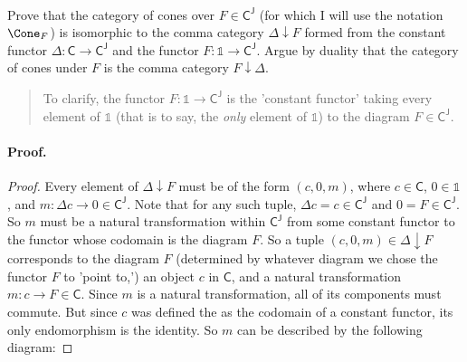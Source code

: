 \documentclass[main.tex]{subfiles}
\begin{document}
	
\paragraph{} 

\begin{exercise}
Prove that the category of cones over $ F \in \mathsf{C^J} $ (for which I will
use the notation $ \Cone_F $) is isomorphic to the comma category $
\Delta \downarrow F $ formed from the constant functor $ \Delta \colon
\mathsf{C} \to \mathsf{C^J} $ and the functor $ F \colon \mathbb{1} \to
\mathsf{C^J} $. Argue by duality that the category of cones under $ F $ is the
comma category $ F \downarrow \Delta $.
\end{exercise}
\begin{quote}
	{\small To clarify, the functor $ F \colon \mathbb{1} \to \mathsf{C^J}$ is the 'constant functor' taking every element of  $ \mathbb{1} $ (that is to say, the \textit{only} element of $ \mathbb{1} $) to the diagram $ F \in \mathsf{C^J} $.}
\end{quote}

\paragraph{Proof.} 
\begin{proof}
Every element of $ \Delta \downarrow F $ must be of the form $ (c, 0, m) $,
where $ c \in \textsf{C} $, $ 0 \in \mathbb{1} $, and $ m \colon \Delta c \to 0
\in \mathsf{C^J} $. Note that for any such tuple, $ \Delta c = c \in
\mathsf{C^J}$ and $ 0 = F \in \mathsf{C^J}$. So $ m $ must be a natural
transformation within $ \mathsf{C^J} $ from some constant functor to the
functor whose codomain is the diagram $ F $. So a tuple $ (c, 0, m) \in \Delta
\downarrow F $ corresponds to the diagram $ F $ (determined by whatever diagram
we chose the functor $ F $ to 'point to,') an object $ c $ in $ \mathsf{C} $,
and a natural transformation $ m \colon c \to F \in \mathsf{C}$. Since $ m $ is
a natural transformation, all of its components must commute. But since $ c $
was defined the as the codomain of a constant functor, its only endomorphism is
the identity. So $ m $ can be described by the following diagram:
\end{proof}

\end{document}
